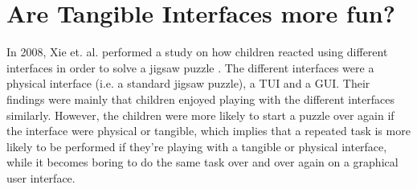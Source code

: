 \section{Are Tangible Interfaces more fun?}
In 2008, Xie et. al. performed a study on how children reacted using different interfaces in order to solve a jigsaw puzzle \cite{xie2008tangibles}. The different interfaces were a physical interface (i.e. a standard jigsaw puzzle), a TUI and a GUI. Their findings were mainly that children enjoyed playing with the different interfaces similarly. However, the children were more likely to start a puzzle over again if the interface were physical or tangible, which implies that a repeated task is more likely to be performed if they're playing with a tangible or physical interface, while it becomes boring to do the same task over and over again on a graphical user interface.   


